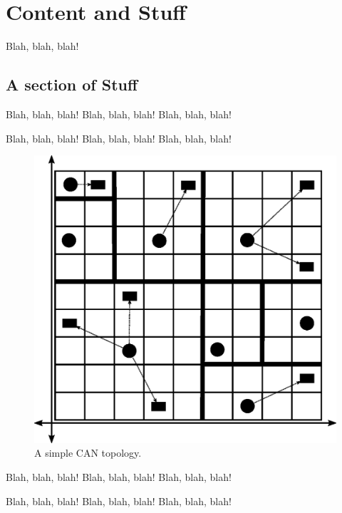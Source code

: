 \chapter{Content and Stuff}

Blah, blah, blah!

\section{A section of Stuff}

Blah, blah, blah! Blah, blah, blah! Blah, blah, blah!

Blah, blah, blah! Blah, blah, blah! Blah, blah, blah!

\begin{figure}[htp]
\begin{center}
\includegraphics[scale=0.65]{can.eps}
\caption{A simple CAN topology.}
\label{can}
\end{center}
\end{figure}

Blah, blah, blah! Blah, blah, blah! Blah, blah, blah!

Blah, blah, blah! Blah, blah, blah! Blah, blah, blah!

